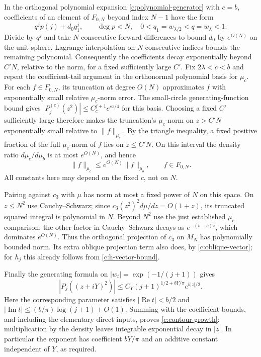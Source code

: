 \documentclass[11pt]{article}
\numberwithin{equation}{section}
\theoremstyle{definition}\newtheorem{definition}[theorem]{Definition}
\theoremstyle{remark}\newtheorem{remark}[theorem]{Remark}
\begin{document}
In the orthogonal polynomial expansion
\eqref{c:polynomial-generator} with $c=b$,
coefficients of an element of $F_{0,N}$ beyond index $N-1$ have the
form
\[
 q^jp(j)+d_0q_1^j,\qquad \deg p<N,
 \quad 0<q_1=w_{\lambda/2}<q=w_\lambda<1.
\]
Divide by $q^j$ and take $N$ consecutive forward differences to bound
$d_0$ by $e^{O(N)}$ on the unit sphere.  Lagrange interpolation on
$N$ consecutive indices bounds the remaining polynomial.  Consequently
the coefficients decay exponentially beyond $C'N$, relative to the
norm, for a fixed sufficiently large $C'$.
Fix $2\lambda<c<b$ and repeat the coefficient-tail argument in the
orthonormal polynomial basis for $\mu_c$. For each $f\in F_{0,N}$,
its truncation at degree $O(N)$ approximates $f$ with exponentially
small relative $\mu_c$-norm error. The small-circle generating-function
bound gives $|P_j^{(c)}(z^2)|\le C_c^{j+1}e^{cz/4}$ for this basis.
Choosing a fixed $C'$ sufficiently large therefore makes the
truncation's $\mu_c$-norm on $z>C'N$ exponentially small relative to
$\|f\|_{\mu_c}$. By the triangle inequality, a fixed positive fraction
of the full $\mu_c$-norm of $f$ lies on $z\le C'N$. On this interval
the density ratio $d\mu_c/d\mu_b$ is at most $e^{O(N)}$, and hence
\[
 \|f\|_{\mu_c}\le e^{O(N)}\|f\|_{\mu_b},\qquad f\in F_{0,N}.
\]
All constants here may depend on the fixed $c$, not on $N$.

Pairing against $c_3$ with $\mu$ has norm at most a fixed power of
$N$ on this space.  On $z\le N^2$ use Cauchy--Schwarz; since
$c_3(z^2)^2d\mu/dz=O(1+z)$, its truncated squared integral is
polynomial in $N$.  Beyond $N^2$ use the just established $\mu_c$
comparison: the other factor in Cauchy--Schwarz decays as
$e^{-(b-c)z}$, which dominates $e^{O(N)}$.  Thus the orthogonal
projection of $c_3$ on $M_N$ has polynomially bounded norm.  Its
extra oblique projection term also does, by
\eqref{c:oblique-vector}; for $h_j$ this already follows from
\eqref{c:h-vector-bound}.

Finally the generating formula on
$|w_t|=\exp(-1/(j+1))$ gives
\[
 |P_j((z+iY)^2)|
 \le C_Y(j+1)^{1/2+bY/\pi}e^{b|z|/2}.
\]
Here the corresponding parameter satisfies
$|\operatorname{Re}t|<b/2$ and
$|\operatorname{Im}t|\le(b/\pi)\log(j+1)+O(1)$.
Summing with the coefficient bounds, and including the elementary
direct inputs, proves \eqref{c:contour-growth}: multiplication by the
density leaves integrable exponential decay in $|z|$.  In particular
the exponent has coefficient $bY/\pi$ and an additive constant
independent of $Y$, as required.
\end{document}
